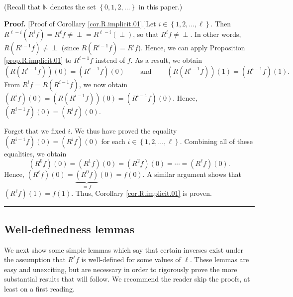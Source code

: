 \documentclass[numbers=enddot,12pt,final,onecolumn,notitlepage]{scrartcl}%
\theoremstyle{definition}
\newenvironment{verlong}{}{}
\newcommand{\undf}{\operatorname*{\bot}}
\newenvironment{proof}[1][Proof]{\noindent\textbf{#1.} }{\ \rule{0.5em}{0.5em}}
\begin{document}
(Recall that $\mathbb{N}$ denotes the set $\left\{  0,1,2,\ldots\right\}  $ in
this paper.)

\begin{verlong}
\begin{proof}
[Proof of Corollary \ref{cor.R.implicit.01}.]Let $i\in\left\{  1,2,\ldots
,\ell\right\}  $. Then $R^{\ell-i}\left(  R^{i}f\right)  =R^{\ell}%
f\neq\undf=R^{\ell-i}\left(  \undf\right)  $, so that $R^{i}f\neq\undf$. In
other words, $R\left(  R^{i-1}f\right)  \neq\undf$ (since $R\left(
R^{i-1}f\right)  =R^{i}f$). Hence, we can apply Proposition
\ref{prop.R.implicit.01} to $R^{i-1}f$ instead of $f$. As a result, we obtain%
\[
\left(  R\left(  R^{i-1}f\right)  \right)  \left(  0\right)  =\left(
R^{i-1}f\right)  \left(  0 \right)  \ \ \ \ \ \ \ \ \ \ \text{and}%
\ \ \ \ \ \ \ \ \ \ \left(  R\left(  R^{i-1}f\right)  \right)  \left(
1\right)  =\left(  R^{i-1}f\right)  \left(  1\right)  .
\]
From $R^{i}f = R\left(  R^{i-1}f\right)  $, we now obtain $\left(
R^{i}f\right)  \left(  0\right)  =\left(  R\left(  R^{i-1}f\right)  \right)
\left(  0\right)  =\left(  R^{i-1}f\right)  \left(  0\right)  $. Hence,
$\left(  R^{i-1}f\right)  \left(  0\right)  =\left(  R^{i}f\right)  \left(
0\right)  $.

Forget that we fixed $i$. We thus have proved the equality $\left(
R^{i-1}f\right)  \left(  0\right)  =\left(  R^{i}f\right)  \left(  0\right)  $
for each $i\in\left\{  1,2,\ldots,\ell\right\}  $. Combining all of these
equalities, we obtain%
\[
\left(  R^{0}f\right)  \left(  0\right)  =\left(  R^{1}f\right)  \left(
0\right)  =\left(  R^{2}f\right)  \left(  0\right)  =\cdots=\left(  R^{\ell
}f\right)  \left(  0\right)  .
\]
Hence, $\left(  R^{\ell}f\right)  \left(  0\right)  =\underbrace{\left(
R^{0}f\right)  }_{=f}\left(  0\right)  =f\left(  0\right)  $. A similar
argument shows that $\left(  R^{\ell}f\right)  \left(  1\right)  =f\left(
1\right)  $. Thus, Corollary \ref{cor.R.implicit.01} is proven.
\end{proof}
\end{verlong}

\subsection{Well-definedness lemmas}

We next show some simple lemmas which say that certain inverses exist under
the assumption that $R^{\ell}f$ is well-defined for some values of $\ell$.
These lemmas are easy and unexciting, but are necessary in order to rigorously
prove the more substantial results that will follow. We recommend the reader
skip the proofs, at least on a first reading.
\end{document}
